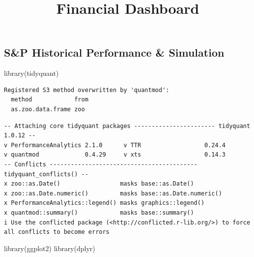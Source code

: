 \documentclass[
  letterpaper,
  DIV=11,
  numbers=noendperiod]{scrartcl}
\title{Financial Dashboard}
\author{}
\date{}
\newenvironment{Shaded}{\begin{snugshade}}{\end{snugshade}}
\newcommand{\FunctionTok}[1]{\textcolor[rgb]{0.28,0.35,0.67}{#1}}
\newcommand{\NormalTok}[1]{\textcolor[rgb]{0.00,0.23,0.31}{#1}}
\begin{document}
\maketitle


\subsection{S\&P Historical Performance \&
Simulation}\label{sp-historical-performance-simulation}

\begin{Shaded}
\begin{Highlighting}[]
\FunctionTok{library}\NormalTok{(tidyquant)}
\end{Highlighting}
\end{Shaded}

\begin{verbatim}
Registered S3 method overwritten by 'quantmod':
  method            from
  as.zoo.data.frame zoo 
\end{verbatim}

\begin{verbatim}
-- Attaching core tidyquant packages ----------------------- tidyquant 1.0.12 --
v PerformanceAnalytics 2.1.0      v TTR                  0.24.4
v quantmod             0.4.29     v xts                  0.14.3
-- Conflicts ------------------------------------------ tidyquant_conflicts() --
x zoo::as.Date()                 masks base::as.Date()
x zoo::as.Date.numeric()         masks base::as.Date.numeric()
x PerformanceAnalytics::legend() masks graphics::legend()
x quantmod::summary()            masks base::summary()
i Use the conflicted package (<http://conflicted.r-lib.org/>) to force all conflicts to become errors
\end{verbatim}

\begin{Shaded}
\begin{Highlighting}[]
\FunctionTok{library}\NormalTok{(ggplot2)}
\FunctionTok{library}\NormalTok{(dplyr)}
\end{Highlighting}
\end{Shaded}
\end{document}
